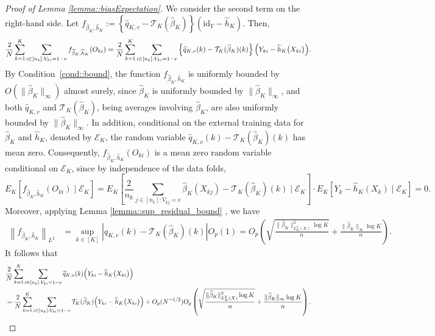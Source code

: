 \documentclass[11pt]{article}
\theoremstyle{plain}
\theoremstyle{definition}
\theoremstyle{remark}
\theoremstyle{definition}
\begin{document}
\begin{proof}[Proof of Lemma \ref{lemma::biasExpectation}]
We consider the second term on the right-hand side. Let \( f_{\widehat{\beta}_K,\widehat{h}_K} := \left\{\widehat{q}_{K,v} - \mathcal{T}_{K}(\widehat{\beta}_K)\right\} \left(\mathrm{id}_Y - \widehat{h}_K\right) \). Then,
  \begin{align*}
    \frac{2}{N}   \sum_{k=1}^K \sum_{i \in [n_k]: V_{ki} = 1-v} f_{\widehat{\beta}_K,\widehat{h}_K}(O_{ki})=    \frac{2}{N}   \sum_{k=1}^K \sum_{i \in [n_k]: V_{ki} = 1-v}  \left\{\widehat{q}_{K,v}(k) - \mathcal{T}_{K}  (\widehat{\beta}_K)(k)\right\} \Bigl(Y_{ki} - \widehat{h}_K\bigl(X_{ki}\bigr)\Bigr). 
  \end{align*}  
By Condition~\ref{cond::bound}, the function $f_{\widehat{\beta}_K,\widehat{h}_K}$ is uniformly bounded by \( O(\|\widehat{\beta}_K\|_{\infty}) \) almost surely, since \( \widehat{\beta}_K \) is uniformly bounded by \( \|\widehat{\beta}_K\|_{\infty} \), and both \( \widehat{q}_{K,v} \) and \( \mathcal{T}_{K}(\widehat{\beta}_K) \), being averages involving \( \widehat{\beta}_K \), are also uniformly bounded by \( \|\widehat{\beta}_K\|_{\infty} \). In addition, conditional on the external training data for \( \widehat{\beta}_K \) and \( \widehat{h}_K \), denoted by \( \mathcal{E}_K \), the random variable \( \widehat{q}_{K,v}(k) - \mathcal{T}_{K}(\widehat{\beta}_K)(k) \) has mean zero. Consequently, $f_{\widehat{\beta}_K,\widehat{h}_K}(O_{ki})$ is a mean zero random variable conditional on $\mathcal{E}_K$, since by independence of the data folds, 
$$E_K[f_{\widehat{\beta}_K,\widehat{h}_K}(O_{ki}) \mid \mathcal{E}_K] = E_K\left[ \frac{2}{n_k}  \sum_{j \in [n_k]:  V_{kj} = v} \widehat{\beta}_K(X_{kj}) - \mathcal{T}_{K}(\widehat{\beta}_K)(k) \mid \mathcal{E}_K\right] \cdot E_K[Y_k - \widehat{h}_K(X_k)  \mid \mathcal{E}_K]  = 0.$$
Moreover, applying Lemma \ref{lemma::sup_residual_bound} , we have
\begin{align*}
    \left\|f_{\widehat{\beta}_K,\widehat{h}_K}  \right\|_{L^2} &= \sup_{k \in [K]} \left|\widehat{q}_{K,v}(k) - \mathcal{T}_{K}(\widehat{\beta}_K)(k) \right| O_p(1)  = O_p\left( \sqrt{\frac{\|\widehat{\beta}_K\|_{L^2_K(X)}^2 \log K}{n}} + \frac{\|\widehat{\beta}_K\|_{\infty} \log K}{n} \right).
\end{align*}
It follows that
\begin{align*}
        & \frac{2}{N}  \sum_{k=1}^K \sum_{i \in [n_k]: V_{ki} = 1-v}   \widehat{q}_{K,v}(k) \Bigl(Y_{ki} - \widehat{h}_K\bigl(X_{ki}\bigr)\Bigr)\\
         &=  \frac{2}{N}   \sum_{k=1}^K \sum_{i \in [n_k]: V_{ki} = 1-v}  \mathcal{T}_{K}(\widehat{\beta}_K) \Bigl(Y_{ki} - \widehat{h}_K\bigl(X_{ki}\bigr)\Bigr) +  O_p(N^{-1/2}) O_p\left( \sqrt{\frac{\|\widehat{\beta}_K\|_{L^2_K(X)}^2 \log K}{n}} + \frac{\|\widehat{\beta}_K\|_{\infty} \log K}{n} \right).

\end{align*}
\end{proof}
\end{document}
